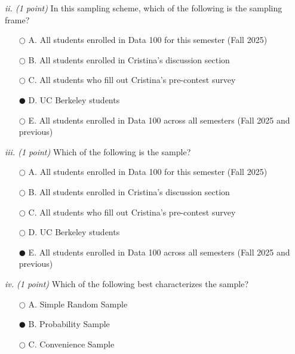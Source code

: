 \documentclass[11pt]{article}
\begin{document}
\textit{ii. (1 point)} In this sampling scheme, which of the following is the sampling frame?
\begin{itemize} [leftmargin=4em]
    \item[$\bigcirc$] A. All students enrolled in Data 100 for this semester (Fall 2025)
    \item[$\bigcirc$] B. All students enrolled in Cristina’s discussion section
    \item[$\bigcirc$] C. All students who fill out Cristina’s pre-contest survey
    \item[$\mdlgblkcircle$] D. UC Berkeley students
    \item[$\bigcirc$] E. All students enrolled in Data 100 across all semesters (Fall 2025 and previous)
\end{itemize}

\textit{iii. (1 point)} Which of the following is the sample?
\begin{itemize} [leftmargin=4em]
    \item[$\bigcirc$] A. All students enrolled in Data 100 for this semester (Fall 2025)
    \item[$\bigcirc$] B. All students enrolled in Cristina’s discussion section
    \item[$\bigcirc$] C. All students who fill out Cristina’s pre-contest survey
    \item[$\bigcirc$] D. UC Berkeley students
    \item[$\mdlgblkcircle$] E. All students enrolled in Data 100 across all semesters (Fall 2025 and previous)
\end{itemize}

\textit{iv. (1 point)} Which of the following best characterizes the sample?
\begin{itemize} [leftmargin=4em]
    \item[$\bigcirc$] A. Simple Random Sample
    \item[$\mdlgblkcircle$] B. Probability Sample
    \item[$\bigcirc$] C. Convenience Sample
\end{itemize}
\end{document}
